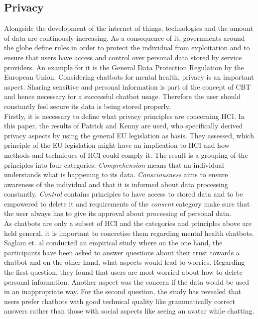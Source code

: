 \documentclass[sigconf, nonacm]{acmart}
\begin{document}
\subsection{Privacy}
Alongside the development of the internet of things, technologies and the amount of data are continously increasing\cite{Reinsel2018}.
As a consequence of it, governments around the globe define rules in order to protect the individual from exploitation and to ensure that users have access and control over personal data stored by service providers.
An example for it is the General Data Protection Regulation by the European Union. Considering chatbots for mental health, privacy is an important aspect. Sharing sensitive and personal information is part of the concept of CBT and hence necessary for a successful chatbot usage. Therefore the user should constantly feel secure its data is being stored properly. 
\\
Firstly, it is necessary to define what privacy principles are concerning HCI. In this paper, the results of Patrick and Kenny are used, who specifically derived privacy aspects by using the general EU legislation as basis.
They assessed, which principle of the EU legislation might have an implication to HCI and how methods and techniques of HCI could comply it. The result is a grouping of the principles into four categories: \emph{Comprehension} means that an individual understands what is happening to its data. \emph{Consciousness} aims to ensure
awareness of the individual and that it is informed about data processing constantly. \emph{Control} contains principles to have access to stored data and to be empowered to delete it and requirements of the \emph{consent} category make sure that the user always has to give its approval about processing of personal data.\cite{Patrick2003}
\\
As chatbots are only a subset of HCI and the categories and principles above are held general, it is important to concretise them regarding mental health chatbots. Saglam et. al conducted an empirical study where on the one hand, the participants have been asked to answer questions about their trust towards a chatbot and 
on the other hand, what aspects would lead to worries. Regarding the first question, they found that users are most worried about how to delete personal information. Another aspect was the concern if the data would be used in an inappropriate way. 
For the second question, the study has revealed that users prefer chatbots with good technical quality like grammatically correct answers rather than those with social aspects like seeing an avatar while chatting.\cite{Shamim2021}
\end{document}
